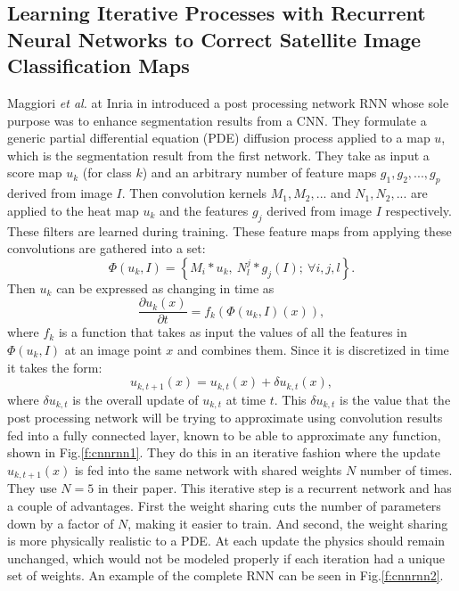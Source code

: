 \subsection{Learning Iterative Processes with Recurrent Neural Networks to Correct Satellite Image Classification Maps}\label{PDERNN}
Maggiori \textit{et al.} at Inria in  \cite{maggiori2016learning} introduced a post processing network RNN whose sole purpose was to enhance segmentation results from a CNN. They formulate a generic partial differential equation (PDE) diffusion process applied to a map $u$, which is the segmentation result from the first network. They take as input a score map $u_k$ (for class $k$) and an arbitrary number of feature maps ${g_1,g_2,...,g_p}$ derived from image $I$. Then convolution kernels ${M_1,M_2,...}$ and ${N_1,N_2,...}$ are applied to the heat map $u_k$ and the features $g_j$ derived from image $I$ respectively. These filters are learned during training. These feature maps from applying these convolutions are gathered into a set:
\begin{equation}
\Phi(u_k,I) = \left\{ M_i \ast u_k, ~N_l^j \ast g_j(I);~\forall i,j,l\right\}.
\label{eq:cnnrnnset}
\end{equation}
Then $u_k$ can be expressed as changing in time as
\begin{equation}
\frac{\partial u_k(x)}{\partial t} = f_k(\Phi(u_k,I)(x)),
\label{eq:cnnrnn1}
\end{equation}
where $f_k$ is a function that takes as input the values of all the features in $\Phi(u_k,I)$ at an image point $x$ and combines them. Since it is discretized in time it takes the form:
\begin{equation}
u_{k,t+1}(x) = u_{k,t}(x) + \delta u_{k,t}(x),
\label{eq:}
\end{equation}
where $\delta u_{k,t}$ is the overall update of $u_{k,t}$ at time $t$. This $\delta u_{k,t}$ is the value that the post processing network will be trying to approximate using convolution results fed into a fully connected layer, known to be able to approximate any function, shown in Fig.\ref{f:cnnrnn1}. They do this in an iterative fashion where the update $u_{k,t+1}(x)$ is fed into the same network with shared weights $N$ number of times. They use $N = 5$ in their paper. This iterative step is a recurrent network and has a couple of advantages. First the weight sharing cuts the number of parameters down by a factor of $N$, making it easier to train. And second, the weight sharing is more physically realistic to a PDE. At each update the physics should remain unchanged, which would not be modeled properly if each iteration had a unique set of weights. An example of the complete RNN can be seen in Fig.\ref{f:cnnrnn2}.
